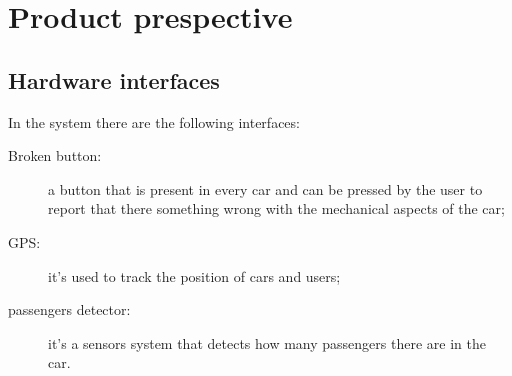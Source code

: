 \section{Product prespective}

\subsection{Hardware interfaces}
In the system there are the following interfaces:
\begin{description}
	\item [Broken button:] a button that is present in every car and can be pressed by the user to report that there something wrong with the mechanical aspects of the car;
	\item [GPS:] it's used to track the position of cars and users;
	\item [passengers detector:] it's a sensors system that detects how many passengers there are in the car.
\end{description}
